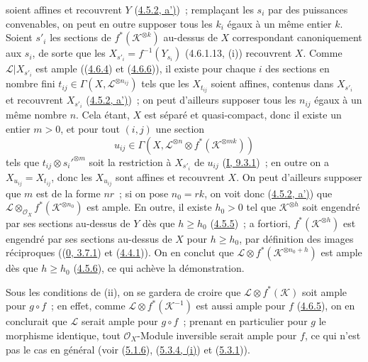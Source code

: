soient affines et recouvrent $Y$
(\hyperref[II.4.5.2-fr]{4.5.2, a')})~;
remplaçant les $s_i$ par des puissances convenables, on peut en outre
supposer tous les $k_i$ égaux à un même entier $k$. Soient $s'_i$ les
sections de $f^*(\mathcal{K}^{\otimes k})$ au-dessus de $X$ correspondant
canoniquement aux $s_i$, de sorte que les
$X_{s'_i}=f^{-1}(Y_{s_i})$ (4.6.1.13, (i))
recouvrent $X$. Comme $\mathcal{L}|X_{s'_i}$ est ample
((\hyperref[II.4.6.4-fr]{4.6.4}) et
(\hyperref[II.4.6.6-fr]{4.6.6})), il existe pour chaque $i$ des sections en
nombre fini $t_{ij}\in\Gamma(X,\mathcal{L}^{\otimes n_{ij}})$ tels que les
$X_{t_{ij}}$ soient affines, contenus dans $X_{s'_i}$ et recouvrent
$X_{s'_i}$ (\hyperref[II.4.5.2-fr]{4.5.2, a')})~; on peut d'ailleurs
supposer tous les $n_{ij}$ égaux à un même nombre $n$. Cela étant, $X$ est
séparé et quasi-compact, donc il existe un entier $m>0$, et pour tout
$(i,j)$ une section
\[
  u_{ij}\in\Gamma(X,\mathcal{L}^{\otimes n}\otimes
  f^*(\mathcal{K}^{\otimes mk}))
\]
tels que $t_{ij}\otimes s_i'^{\otimes m}$ soit la restriction à $X_{s'_i}$
de $u_{ij}$ (\hyperref[I.9.3.1-fr]{I, 9.3.1})~; en outre on a
$X_{u_{ij}}=X_{t_{ij}}$, donc les $X_{u_{ij}}$ sont affines et recouvrent
$X$. On peut d'ailleurs supposer que $m$ est de la forme $nr$~; si on pose
$n_0=rk$, on voit donc (\hyperref[II.4.5.2-fr]{4.5.2, a')}) que
$\mathcal{L}\otimes_{\mathcal{O}_X}f^*(\mathcal{K}^{\otimes n_0})$ est
ample. En outre,
il existe $h_0>0$ tel que $\mathcal{K}^{\otimes h}$ soit engendré par ses
sections au-dessus de $Y$ dès que $h\geq h_0$
(\hyperref[II.4.5.5-fr]{4.5.5})~; a fortiori,
$f^*(\mathcal{K}^{\otimes h})$ est engendré par ses sections au-dessus de
$X$ pour $h\geq h_0$, par définition des images réciproques
((\hyperref[0.3.7.1-fr]{0, 3.7.1}) et
(\hyperref[II.4.4.1-fr]{4.4.1})). On en conclut que
$\mathcal{L}\otimes f^*(\mathcal{K}^{\otimes n_0+h})$ est ample dès que
$h\geq h_0$ (\hyperref[II.4.5.6-fr]{4.5.6}), ce qui achève la
démonstration.

\begin{remark}[4.6.14]
\label{II.4.6.14-fr}
Sous les conditions de (ii), on se gardera de croire que
$\mathcal{L}\otimes f^*(\mathcal{K})$ soit ample pour $g\circ f$~; en effet,
comme $\mathcal{L}\otimes f^*(\mathcal{K}^{-1})$ est aussi ample pour $f$
(\hyperref[II.4.6.5-fr]{4.6.5}), on en conclurait que $\mathcal{L}$ serait
ample pour $g\circ f$~; prenant en particulier pour $g$ le morphisme
identique, tout $\mathcal{O}_X$-Module inversible serait ample pour $f$, ce
qui n'est pas le cas en général (voir (\hyperref[II.5.1.6-fr]{5.1.6}),
(\hyperref[II.5.3.4-fr]{5.3.4, (i)}) et
(\hyperref[II.5.3.1-fr]{5.3.1})).
\end{remark}

